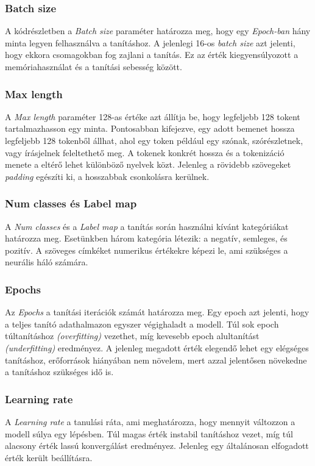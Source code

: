 \documentclass[12pt]{article}
\begin{document}
\subsubsection{Batch size}
A kódrészletben a \textit{Batch size} paraméter határozza meg, hogy egy \textit{Epoch-ban} hány minta legyen felhasználva a tanításhoz. A jelenlegi 16-os \textit{batch size} azt jelenti, hogy ekkora csomagokban fog zajlani a tanítás. Ez az érték kiegyensúlyozott a memóriahasználat és a tanítási sebesség között.

\subsubsection{Max length}
A \textit{Max length} paraméter 128-as értéke azt állítja be, hogy legfeljebb 128 tokent tartalmazhasson egy minta. Pontosabban kifejezve, egy adott bemenet hossza legfeljebb 128 tokenből állhat, ahol egy token például egy szónak, szórészletnek, vagy írásjelnek feleltethető meg. A tokenek konkrét hossza és a tokenizáció menete a eltérő lehet különböző nyelvek közt. Jelenleg a rövidebb szövegeket \textit{padding} egészíti ki, a hosszabbak csonkolásra kerülnek.

\subsubsection{Num classes és Label map}
A \textit{Num classes} és a \textit{Label map} a tanítás során használni kívánt kategóriákat határozza meg. Esetünkben három kategória létezik: a negatív, semleges, és pozitív. A szöveges címkéket numerikus értékekre képezi le, ami szükséges a neurális háló számára.

\subsubsection{Epochs}
Az \textit{Epochs} a tanítási iterációk számát határozza meg. Egy epoch azt jelenti, hogy a teljes tanító adathalmazon egyszer végighaladt a modell. Túl sok epoch túltanításhoz \textit{(overfitting)} vezethet, míg kevesebb epoch alultanítást \textit{(underfitting)} eredményez. A jelenleg megadott érték elegendő lehet egy elégséges tanításhoz, erőforrások hiányában nem növelem, mert azzal jelentősen növekedne a tanításhoz szükséges idő is.

\subsubsection{Learning rate}
A \textit{Learning rate} a tanulási ráta, ami meghatározza, hogy mennyit változzon a modell súlya egy lépésben. Túl magas érték instabil tanításhoz vezet, míg túl alacsony érték lassú konvergálást eredményez. Jelenleg egy általánosan elfogadott érték került beállításra.
\end{document}
